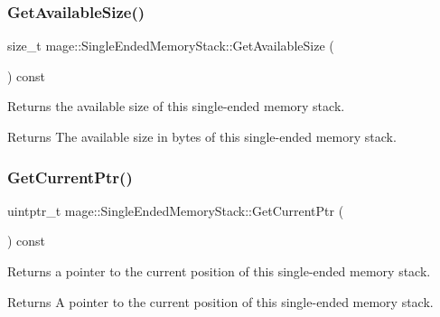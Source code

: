 \subsubsection{\texorpdfstring{Get\+Available\+Size()}{GetAvailableSize()}}
{\footnotesize\ttfamily size\+\_\+t mage\+::\+Single\+Ended\+Memory\+Stack\+::\+Get\+Available\+Size (\begin{DoxyParamCaption}{ }\end{DoxyParamCaption}) const\hspace{0.3cm}{\ttfamily [noexcept]}}

Returns the available size of this single-\/ended memory stack.

\begin{DoxyReturn}{Returns}
The available size in bytes of this single-\/ended memory stack. 
\end{DoxyReturn}
\mbox{\label{classmage_1_1_single_ended_memory_stack_a11b792ad420eac8e620c568e89a88cef}} 
\subsubsection{\texorpdfstring{Get\+Current\+Ptr()}{GetCurrentPtr()}}
{\footnotesize\ttfamily uintptr\+\_\+t mage\+::\+Single\+Ended\+Memory\+Stack\+::\+Get\+Current\+Ptr (\begin{DoxyParamCaption}{ }\end{DoxyParamCaption}) const\hspace{0.3cm}{\ttfamily [noexcept]}}

Returns a pointer to the current position of this single-\/ended memory stack.

\begin{DoxyReturn}{Returns}
A pointer to the current position of this single-\/ended memory stack. 
\end{DoxyReturn}
\mbox{\label{classmage_1_1_single_ended_memory_stack_aa1df0adf194d6c2bb6c7597a96c10e61}} 
